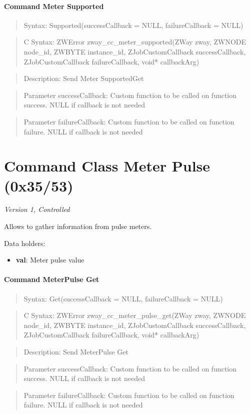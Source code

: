 \paragraph{Command Meter Supported}
\begin{quote}Syntax: Supported(successCallback = NULL, failureCallback = NULL)\end{quote}
\begin{quote}C Syntax: ZWError zway\_cc\_meter\_supported(ZWay zway, ZWNODE node\_id, ZWBYTE instance\_id, ZJobCustomCallback successCallback, ZJobCustomCallback failureCallback, void* callbackArg)\end{quote}
\begin{quote}Description: Send Meter SupportedGet\end{quote}
\begin{quote}Parameter successCallback: Custom function to be called on function success. NULL if callback is not needed\end{quote}
\begin{quote}Parameter failureCallback: Custom function to be called on function failure. NULL if callback is not needed\end{quote}



\section{Command Class Meter Pulse (0x35/53)}

\textit{Version 1, Controlled}
\newline

Allows to gather information from pulse meters.
\newline

\noindent
Data holders:

\begin{itemize}
\item \textbf{val}: Meter pulse value
\end{itemize}

\paragraph{Command MeterPulse Get}
\begin{quote}Syntax: Get(successCallback = NULL, failureCallback = NULL)\end{quote}
\begin{quote}C Syntax: ZWError zway\_cc\_meter\_pulse\_get(ZWay zway, ZWNODE node\_id, ZWBYTE instance\_id, ZJobCustomCallback successCallback, ZJobCustomCallback failureCallback, void* callbackArg)\end{quote}
\begin{quote}Description: Send MeterPulse Get\end{quote}
\begin{quote}Parameter successCallback: Custom function to be called on function success. NULL if callback is not needed\end{quote}
\begin{quote}Parameter failureCallback: Custom function to be called on function failure. NULL if callback is not needed\end{quote}



